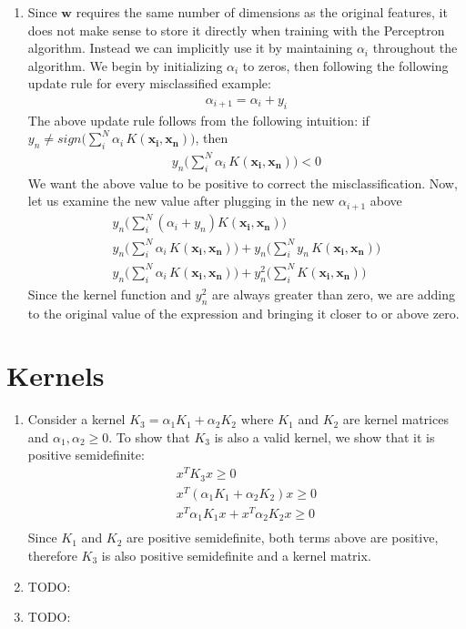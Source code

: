 \documentclass[12pt]{article}
\begin{document}
\begin{enumerate}[label=\alph*.]
	\item Since $\mathbf{w}$ requires the same number of dimensions as the original features, it does not make sense to store it directly when training with the Perceptron algorithm. Instead we can implicitly use it by maintaining $\alpha_i$ throughout the algorithm. We begin by initializing $\alpha_i$ to zeros, then following the following update rule for every misclassified example:
	\begin{gather*}
		\alpha_{i+1} = \alpha_i + y_i
	\end{gather*}
	The above update rule follows from the following intuition: if $y_n \neq sign \bigg( \sum^N_{i}{\alpha_i \, K( \mathbf{x_i}, \mathbf{x_n} )} \bigg) $,  then 
	\begin{gather*}
		y_n \bigg( \sum^N_{i}{\alpha_i \, K( \mathbf{x_i}, \mathbf{x_n} )} \bigg) < 0
	\end{gather*}
	We want the above value to be positive to correct the misclassification. Now, let us examine the new value after plugging in the new $\alpha_{i+1}$ above
	\begin{gather*}
		y_n \bigg( \sum^N_{i}{(\alpha_i + y_n) K( \mathbf{x_i}, \mathbf{x_n} )} \bigg) \\ 
		y_n \bigg( \sum^N_{i}{\alpha_i \, K( \mathbf{x_i}, \mathbf{x_n} )} \bigg) + y_n \bigg( \sum^N_{i}{y_n \, K( \mathbf{x_i}, \mathbf{x_n} )} \bigg) \\
		y_n \bigg( \sum^N_{i}{\alpha_i \, K( \mathbf{x_i}, \mathbf{x_n} )} \bigg) + y_n^2 \bigg( \sum^N_{i}{ K( \mathbf{x_i}, \mathbf{x_n} )} \bigg)
	\end{gather*}
	Since the kernel function and $y_n^2$ are always greater than zero, we are adding to the original value of the expression and bringing it closer to or above zero.
\end{enumerate}

\section{Kernels}
\begin{enumerate}[label=\alph*.]
	\item Consider a kernel $K_3 = \alpha_1 K_1 + \alpha_2 K_2$ where $K_1$ and $K_2$ are kernel matrices and $\alpha_1 , \alpha_2 \geq 0$. To show that $K_3$ is also a valid kernel, we show that it is positive semidefinite:
	\begin{gather*}
		x^T K_3 x \geq 0 \\
		x^T ( \alpha_1 K_1 + \alpha_2 K_2 ) x \geq 0 \\
		x^T \alpha_1 K_1  x  + x^T \alpha_2 K_2  x \geq 0 \\
	\end{gather*}
	Since  $K_1$ and $K_2$ are positive semidefinite, both terms above are positive, therefore $K_3$ is also positive semidefinite and a kernel matrix.
	
	\item TODO:
	
	\item TODO:
\end{enumerate}
\end{document}
